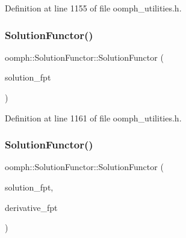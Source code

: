 Definition at line 1155 of file oomph\+\_\+utilities.\+h.

\mbox{\label{classoomph_1_1SolutionFunctor_affba272bc861b18cab3a1975496427c1}} 
\subsubsection{\texorpdfstring{Solution\+Functor()}{SolutionFunctor()}\hspace{0.1cm}{\footnotesize\ttfamily [2/4]}}
{\footnotesize\ttfamily oomph\+::\+Solution\+Functor\+::\+Solution\+Functor (\begin{DoxyParamCaption}\item[{\hyperlink{classoomph_1_1SolutionFunctorBase_a6df07384ce36c784c7befe7d7bf4a606}{Time\+Space\+To\+Double\+Vect\+Fct\+Pt}}]{solution\+\_\+fpt }\end{DoxyParamCaption})\hspace{0.3cm}{\ttfamily [inline]}}



Definition at line 1161 of file oomph\+\_\+utilities.\+h.

\mbox{\label{classoomph_1_1SolutionFunctor_a95e64ff5b9c4137a58002c6298ab452d}} 
\subsubsection{\texorpdfstring{Solution\+Functor()}{SolutionFunctor()}\hspace{0.1cm}{\footnotesize\ttfamily [3/4]}}
{\footnotesize\ttfamily oomph\+::\+Solution\+Functor\+::\+Solution\+Functor (\begin{DoxyParamCaption}\item[{\hyperlink{classoomph_1_1SolutionFunctorBase_a6df07384ce36c784c7befe7d7bf4a606}{Time\+Space\+To\+Double\+Vect\+Fct\+Pt}}]{solution\+\_\+fpt,  }\item[{\hyperlink{classoomph_1_1SolutionFunctorBase_aca237d543e590a388b771aea22d3aad6}{Time\+Space\+Value\+To\+Double\+Vect\+Fct\+Pt}}]{derivative\+\_\+fpt }\end{DoxyParamCaption})\hspace{0.3cm}{\ttfamily [inline]}}



